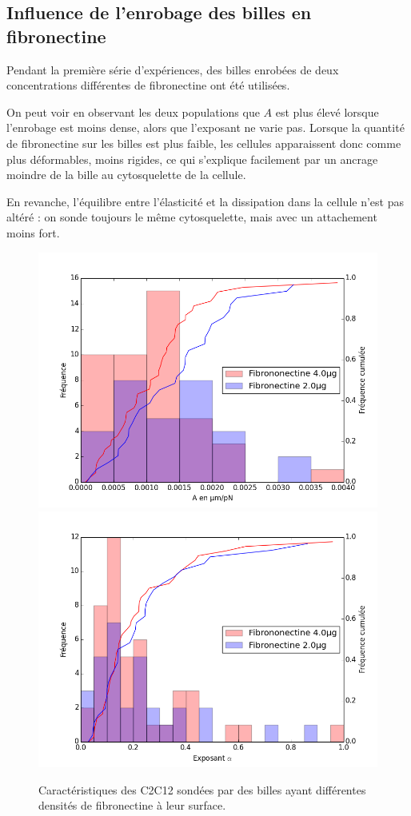 \subsection{Influence de l'enrobage des billes en fibronectine}

Pendant la première série d'expériences, des billes enrobées de deux concentrations différentes de fibronectine ont été utilisées. 

On peut voir en observant les deux populations que $A$ est plus élevé lorsque l'enrobage est moins dense, alors que l'exposant ne varie pas.
Lorsque la quantité de fibronectine sur les billes est plus faible, les cellules apparaissent donc comme plus déformables, moins rigides, ce qui s'explique facilement par un ancrage moindre de la bille au cytosquelette de la cellule.  

En revanche, l'équilibre entre l'élasticité et la dissipation dans la cellule n'est pas altéré : on sonde toujours le même cytosquelette, mais avec un attachement moins fort. 

\begin{figure}
\includegraphics[scale=0.5]{Figures/A_coating.png} 
\includegraphics[scale=0.5]{Figures/E_coating.png} 
\caption{Caractéristiques des C2C12 sondées par des billes ayant différentes densités de fibronectine à leur surface.}
\end{figure}

